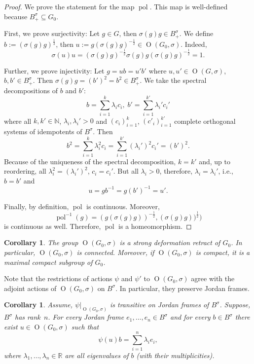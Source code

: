 \documentclass[a4paper,oneside,11pt]{amsart}
\DeclareMathOperator{\OO}{O}
\DeclareMathOperator{\pol}{pol}
\newcommand{\R}{\mathbb R}
\newcommand{\N}{\mathbb N}
\theoremstyle{plain}
\newtheorem{cor}[teo]{Corollary}
\theoremstyle{definition}
\theoremstyle{remark}
\begin{document}
\begin{proof} We prove the statement for the map $\pol$.
This map is well-defined because $B^{\sigma}_+\subseteq G_0$. 

First, we prove surjectivity: Let $g\in G$, then $\sigma(g)g\in B^{\sigma}_+$. We define $b:=(\sigma(g)g)^{\frac{1}{2}}$, then $u:=g(\sigma(g)g)^{-\frac{1}{2}}\in \OO(G_0,\sigma)$. Indeed,
$$\sigma(u)u=(\sigma(g)g)^{-\frac{1}{2}}\sigma(g)g(\sigma(g)g)^{-\frac{1}{2}}=1.$$

Further, we prove injectivity: Let $g=ub=u'b'$ where $u,u'\in \OO(G,\sigma)$, $b,b'\in B^{\sigma}_+$. Then $\sigma(g)g=(b')^2=b^2\in B^{\sigma}_+$. We take the spectral decompositions of $b$ and $b'$:
$$b=\sum_{i=1}^k\lambda_i c_i,\;b'=\sum_{i=1}^{k'}\lambda_i' c_i'$$
where all $k,k'\in \N$, $\lambda_i,\lambda_i'>0$ and $(c_i)_{i=1}^k$, $(c'_i)_{i=1}^{k'}$ complete orthogonal systems of idempotents of $B^{\sigma}$. Then
$$b^2=\sum_{i=1}^k\lambda_i^2 c_i=\sum_{i=1}^{k'}(\lambda_i')^2 c_i'=(b')^2.$$
Because of the uniqueness of the spectral decomposition, $k=k'$ and, up to reordering, all $\lambda_i^2=(\lambda_i')^2$, $c_i=c_i'$. But all $\lambda_i>0$, therefore, $\lambda_i=\lambda_i'$, i.e., $b=b'$ and $$u=gb^{-1}=g(b')^{-1}=u'.$$

Finally, by definition, $\pol$ is continuous. Moreover, $$\pol^{-1}(g)=(g(\sigma(g)g))^{-\frac{1}{2}},(\sigma(g)g))^\frac{1}{2})$$
is continuous as well. Therefore, $\pol$ is a homeomorphism.
\end{proof}

\begin{cor}
    The group $\OO(G_0,\sigma)$ is a strong deformation retract of $G_0$. In particular, $\OO(G_0,\sigma)$ is connected. Moreover, if $\OO(G_0,\sigma)$ is compact, it is a maximal compact subgroup of $G_0$.
\end{cor}

Note that the restrictions of actions $\psi$ and $\psi'$ to $\OO(G_0,\sigma)$ agree with the adjoint actions of $\OO(G_0,\sigma)$ on $B^\sigma$. In particular, they preserve Jordan frames.

\begin{cor}\label{Spec_teo_B2a} Assume, $\psi|_{\OO(G_0,\sigma)}$ is transitive on Jordan frames of $B^{\sigma}$. Suppose, $B^{\sigma}$ has rank~$n$. For every Jordan frame $e_1,\dots,e_n\in B^{\sigma}$ and for every $b\in B^{\sigma}$ there exist $u\in \OO(G_0,\sigma)$ such that
$$\psi(u)b=\sum_{i=1}^n\lambda_ie_i,$$
where $\lambda_1,\dots,\lambda_n\in\R$ are all eigenvalues of $b$ (with their multiplicities).
\end{cor}
\end{document}
